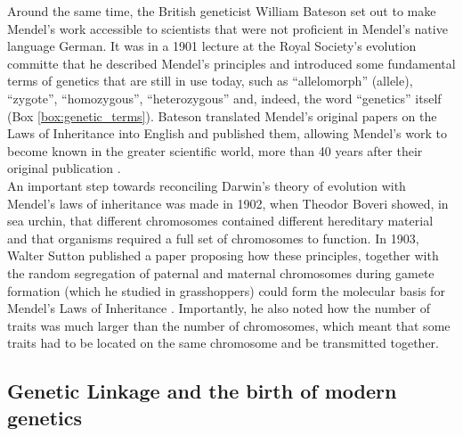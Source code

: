 Around the same time, the British geneticist William Bateson set out to make Mendel’s work accessible to scientists that were not proficient in Mendel’s native language German.
It was in a 1901 lecture at the Royal Society's evolution committe that he described Mendel's principles and introduced some fundamental terms of genetics that are still in use today, such as “allelomorph” (allele), “zygote”, “homozygous”, “heterozygous” and, indeed, the word “genetics” itself (Box \ref{box:genetic_terms}).
Bateson translated Mendel’s original papers on the Laws of Inheritance into English and published them, allowing Mendel’s work to become known in the greater scientific world, more than 40 years after their original publication \cite{bateson2013mendel}.\\ 

An important step towards reconciling Darwin’s theory of evolution with Mendel’s laws of inheritance was made in 1902, when Theodor Boveri showed, in sea urchin, that different chromosomes contained different hereditary material and that organisms required a full set of chromosomes to function. 
In 1903, Walter Sutton published a paper proposing how these principles, together with the random segregation of paternal and maternal chromosomes during gamete formation (which he studied in grasshoppers) could form the molecular basis for Mendel’s Laws of Inheritance \cite{sutton1903chromosomes}. 
Importantly, he also noted how the number of traits was much larger than the number of chromosomes, which meant that some traits had to be located on the same chromosome and be transmitted together.

\subsection{Genetic Linkage and the birth of modern genetics} %

